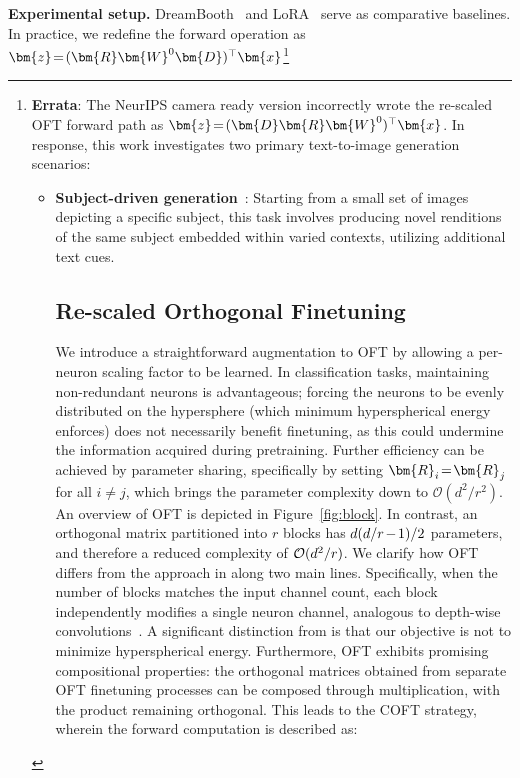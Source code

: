 \textbf{Experimental setup.} DreamBooth~\cite{ruiz2023dreambooth} and LoRA~\cite{hulora2022} serve as comparative baselines. In practice, we redefine the forward operation as $\thickmuskip=2mu \medmuskip=2mu\bm{z}=(\bm{R}\bm{W}^0\bm{D})^\top\bm{x}$\footnote{\textbf{Errata}: The NeurIPS camera ready version incorrectly wrote the re-scaled OFT forward path as $\thickmuskip=2mu \medmuskip=2mu\bm{z}=(\bm{D}\bm{R}\bm{W}^0)^\top\bm{x}$. In response, this work investigates two primary text-to-image generation scenarios:

\begin{itemize}[leftmargin=*,nosep]

    \item \textbf{Subject-driven generation}~\cite{ruiz2023dreambooth}: Starting from a small set of images depicting a specific subject, this task involves producing novel renditions of the same subject embedded within varied contexts, utilizing additional text cues. \subsection{Re-scaled Orthogonal Finetuning}

We introduce a straightforward augmentation to OFT by allowing a per-neuron scaling factor to be learned. In classification tasks, maintaining non-redundant neurons is advantageous; forcing the neurons to be evenly distributed on the hypersphere (which minimum hyperspherical energy enforces) does not necessarily benefit finetuning, as this could undermine the information acquired during pretraining. Further efficiency can be achieved by parameter sharing, specifically by setting $\thickmuskip=2mu \medmuskip=2mu \bm{R}_i = \bm{R}_j$ for all $i \neq j$, which brings the parameter complexity down to $\mathcal{O}(d^2/r^2)$. An overview of OFT is depicted in Figure~\ref{fig:block}. In contrast, an orthogonal matrix partitioned into $r$ blocks has $\thickmuskip=2mu \medmuskip=2mu d(d/r-1)/2$ parameters, and therefore a reduced complexity of $\thickmuskip=2mu \medmuskip=2mu \mathcal{O}(d^2/r)$. We clarify how OFT differs from the approach in \cite{liu2021orthogonal} along two main lines. Specifically, when the number of blocks matches the input channel count, each block independently modifies a single neuron channel, analogous to depth-wise convolutions~\cite{chollet2017xception}. A significant distinction from \cite{liu2021orthogonal} is that our objective is not to minimize hyperspherical energy. Furthermore, OFT exhibits promising compositional properties: the orthogonal matrices obtained from separate OFT finetuning processes can be composed through multiplication, with the product remaining orthogonal. This leads to the COFT strategy, wherein the forward computation is described as:


\end{itemize}}
